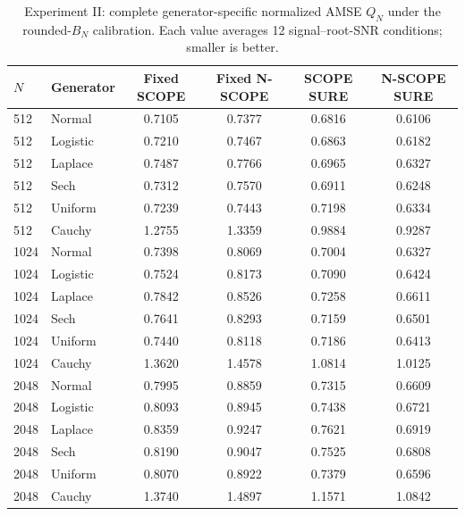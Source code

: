 \begin{table}[tbp]
\centering\small
\caption{Experiment II: complete generator-specific normalized AMSE $Q_N$ under the rounded-$B_N$ calibration. Each value averages 12 signal--root-SNR conditions; smaller is better.}
\label{tab:s5-bn-e2-all}
\setlength{\tabcolsep}{4pt}
\begin{tabular}{llcccc}
\toprule
$N$ & Generator & Fixed SCOPE & Fixed N-SCOPE & SCOPE SURE & N-SCOPE SURE \\
\midrule
512 & Normal & 0.7105 & 0.7377 & 0.6816 & 0.6106 \\
512 & Logistic & 0.7210 & 0.7467 & 0.6863 & 0.6182 \\
512 & Laplace & 0.7487 & 0.7766 & 0.6965 & 0.6327 \\
512 & Sech & 0.7312 & 0.7570 & 0.6911 & 0.6248 \\
512 & Uniform & 0.7239 & 0.7443 & 0.7198 & 0.6334 \\
512 & Cauchy & 1.2755 & 1.3359 & 0.9884 & 0.9287 \\
1024 & Normal & 0.7398 & 0.8069 & 0.7004 & 0.6327 \\
1024 & Logistic & 0.7524 & 0.8173 & 0.7090 & 0.6424 \\
1024 & Laplace & 0.7842 & 0.8526 & 0.7258 & 0.6611 \\
1024 & Sech & 0.7641 & 0.8293 & 0.7159 & 0.6501 \\
1024 & Uniform & 0.7440 & 0.8118 & 0.7186 & 0.6413 \\
1024 & Cauchy & 1.3620 & 1.4578 & 1.0814 & 1.0125 \\
2048 & Normal & 0.7995 & 0.8859 & 0.7315 & 0.6609 \\
2048 & Logistic & 0.8093 & 0.8945 & 0.7438 & 0.6721 \\
2048 & Laplace & 0.8359 & 0.9247 & 0.7621 & 0.6919 \\
2048 & Sech & 0.8190 & 0.9047 & 0.7525 & 0.6808 \\
2048 & Uniform & 0.8070 & 0.8922 & 0.7379 & 0.6596 \\
2048 & Cauchy & 1.3740 & 1.4897 & 1.1571 & 1.0842 \\
\bottomrule
\end{tabular}
\end{table}
